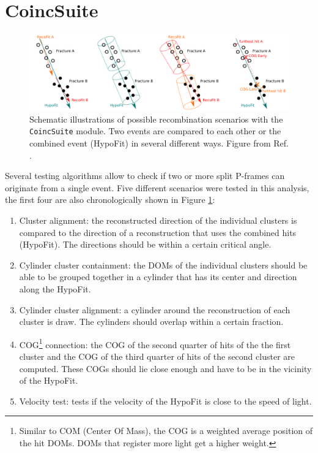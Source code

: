 \section{CoincSuite}
\begin{figure}[t]
\centering
\includegraphics[width=\textwidth]{chapter7/img/coincsuite.png}
\caption{Schematic illustrations of possible recombination scenarios with the \texttt{CoincSuite} module. Two events are compared to each other or the combined event (HypoFit) in several different ways. Figure from Ref. \cite{mzollthesis}.}
\label{fig:coincsuite}
\end{figure}
Several testing algorithms allow to check if two or more split P-frames can originate from a single event. Five different scenarios were tested in this analysis, the first four are also chronologically shown in Figure \ref{fig:coincsuite}:
\vspace{2mm}

\begin{enumerate}
\item Cluster alignment: the reconstructed direction of the individual clusters is compared to the direction of a reconstruction that uses the combined hits (HypoFit). The directions should be within a certain critical angle.
\item Cylinder cluster containment: the DOMs of the individual clusters should be able to be grouped together in a cylinder that has its center and direction along the HypoFit.
\item Cylinder cluster alignment: a cylinder around the reconstruction of each cluster is draw. The cylinders should overlap within a certain fraction.
\item COG\footnote{Similar to COM (Center Of Mass), the COG is a weighted average position of the hit DOMs. DOMs that register more light get a higher weight.} connection: the COG of the second quarter of hits of the the first cluster and the COG of the third quarter of hits of the second cluster are computed. These COGs should lie close enough and have to be in the vicinity of the HypoFit.
\item Velocity test: tests if the velocity of the HypoFit is close to the speed of light.
\end{enumerate}

